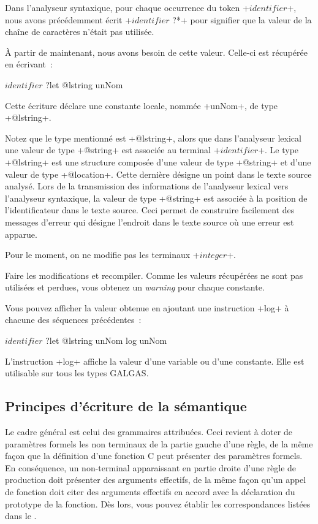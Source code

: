 Dans l’analyseur syntaxique, pour chaque occurrence du token \ggs+$identifier$+, nous avons précédemment écrit \ggs+$identifier$ ?*+ pour signifier que la valeur de la chaîne de caractères n’était pas utilisée.

À partir de maintenant, nous avons besoin de cette valeur. Celle-ci est récupérée en écrivant~:

\begin{galgas}
$identifier$ ?let @lstring unNom
\end{galgas}


Cette écriture déclare une constante locale, nommée \ggs+unNom+, de type \ggs+@lstring+.

Notez que le type mentionné est \ggs+@lstring+, alors que dans l’analyseur lexical une valeur de type \ggs+@string+ est associée au terminal \ggs+$identifier$+. Le type \ggs+@lstring+ est une structure composée d’une valeur de type \ggs+@string+ et d’une valeur de type \ggs+@location+. Cette dernière désigne un point dans le texte source analysé. Lors de la transmission des informations de l’analyseur lexical vers l’analyseur syntaxique, la valeur de type \ggs+@string+ est associée à la position de l’identificateur dans le texte source. Ceci permet de construire facilement des messages d’erreur qui désigne l’endroit dans le texte source où une erreur est apparue.

Pour le moment, on ne modifie pas les terminaux \ggs+$integer$+.

Faire les modifications et recompiler. Comme les valeurs récupérées ne sont pas utilisées et perdues, vous obtenez un \emph{warning} pour chaque constante.

Vous pouvez afficher la valeur obtenue en ajoutant une instruction \ggs+log+ à chacune des séquences précédentes~:
\begin{galgas}
$identifier$ ?let @lstring unNom
log unNom
\end{galgas}

L'instruction \ggs+log+ affiche la valeur d'une variable ou d’une constante. Elle est utilisable sur tous les types GALGAS.

\subsection{Principes d'écriture de la sémantique}

Le cadre général est celui des grammaires attribuées. Ceci revient à doter de paramètres formels les non terminaux de la partie gauche d'une règle, de la même façon que la définition d'une fonction C peut présenter des paramètres formels. En conséquence, un non-terminal apparaissant en partie droite d'une règle de production doit présenter des arguments effectifs, de la même façon qu'un appel de fonction doit citer des arguments effectifs en accord avec la déclaration du prototype de la fonction. Dès lors, vous pouvez établir les correspondances listées dans le .

